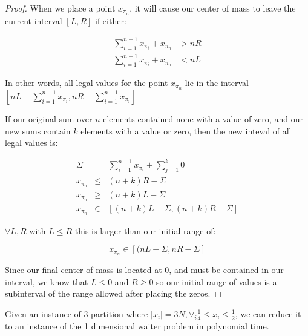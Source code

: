 \begin{proof}
When we place a point $x_{\pi_n}$, it will cause our center of mass to leave the current interval $[L, R]$ if either:

\begin{align*} 
\sum_{i=1}^{n-1} x_{\pi_i} + x_{\pi_n} &> n R \\
\sum_{i=1}^{n-1} x_{\pi_i} + x_{\pi_n} &< n L
\end{align*}

In other words, all legal values for the point $x_{\pi_n}$ lie in the interval $[ n L - \sum_{i=1}^{n-1} x_{\pi_i}, n R - \sum_{i=1}^{n-1} x_{\pi_i}] $

If our original sum over $n$ elements contained none with a value of zero, and our new sums contain $k$ elements with a value or zero, then the new inteval of all legal values is:

\begin{eqnarray*}
\Sigma &=& \sum_{i=1}^{n-1} x_{\pi_i} + \sum_{j=1}^k 0 \\
x_{\pi_n} &\leq& (n+k) R - \Sigma \\
x_{\pi_n} &\geq& (n+k) L - \Sigma \\
x_{\pi_n} &\in& [ (n+k) L - \Sigma, (n+k) R - \Sigma ]
\end{eqnarray*}

$\forall L, R$ with $L \leq R$ this is larger than our initial range of:

\begin{equation*}
x_{\pi_n} \in [ (n L - \Sigma, n R - \Sigma ]
\end{equation*}

Since our final center of mass is located at 0, and must be contained in our interval, we know that $L\leq 0$ and $R\geq 0$ so our initial range of values is a subinterval of the range allowed after placing the zeros.
\end{proof}

\begin{thm}\label{thm:completeness}
Given an instance of 3-partition where $ |x_i| = 3N, \forall_i \frac{1}{4} \leq x_i \leq \frac{1}{2} $, we can reduce it to an instance of the 1 dimensional waiter problem in polynomial time.  
\end{thm}

